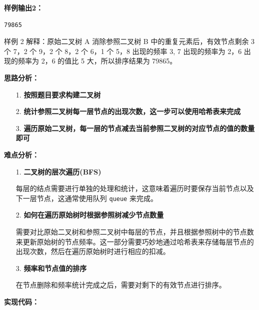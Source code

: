 \documentclass[a4paper]{ctexart}
\begin{document}
\noindent\textbf{样例输出2：}
\lstset{numbers=none}
\begin{lstlisting}
79865
\end{lstlisting}
\lstset{numbers=left}

\noindent 样例 2 解释：原始二叉树 A 消除参照二叉树 B 中的重复元素后，有效节点剩余 3 个 7，2 个 9，2 个 8，2 个 6，1 个 5，8 出现的频率 3, 7 出现的频率为 2，6 出现的频率为 2，6 的值比 5 大，所以排序结果为 79865。
	
\vspace{10pt}
	
\noindent\textbf{思路分析：}
\begin{itemize}
	\item [1.] \textbf{按照题目要求构建二叉树} 
	
	\item [2.] \textbf{统计参照二叉树每一层节点的出现次数，这一步可以使用哈希表来完成}
	
	\item [3.] \textbf{遍历原始二叉树，每一层的节点减去当前参照二叉树的对应节点的值的数量即可}
\end{itemize}

\noindent\textbf{难点分析：}
\begin{itemize}
	\item [1.] \textbf{二叉树的层次遍历(BFS)}
	
	每层的结点需要进行单独的处理和统计，这意味着遍历时要保存当前节点以及下一层节点，这通常使用队列 \texttt{queue} 来完成。
	
	\item [2.] \textbf{如何在遍历原始树时根据参照树减少节点数量}
	
	需要对比原始二叉树和参照二叉树中每层的节点，并且根据参照树中的节点数来更新原始树的节点频率。这一部分需要巧妙地通过哈希表来存储每层节点的出现次数，然后在遍历原始树时进行相应的扣减。
	
	\item [3.] \textbf{频率和节点值的排序}
	
	在节点删除和频率统计完成之后，需要对剩下的有效节点进行排序。
	
\end{itemize}

\noindent\textbf{实现代码：}
	
\end{document}
